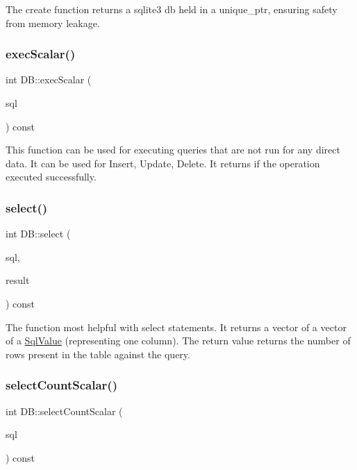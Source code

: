 The create function returns a sqlite3 db held in a unique\+\_\+ptr, ensuring safety from memory leakage. \mbox{\label{classDB_aa81d5bd268236cb48a89717924c957d2}} 
\subsubsection{\texorpdfstring{exec\+Scalar()}{execScalar()}}
{\footnotesize\ttfamily int D\+B\+::exec\+Scalar (\begin{DoxyParamCaption}\item[{const char $\ast$}]{sql }\end{DoxyParamCaption}) const}

This function can be used for executing queries that are not run for any direct data. It can be used for Insert, Update, Delete. It returns if the operation executed successfully. \mbox{\label{classDB_a415cfd60411cfaaba4e88939a54e51eb}} 
\subsubsection{\texorpdfstring{select()}{select()}}
{\footnotesize\ttfamily int D\+B\+::select (\begin{DoxyParamCaption}\item[{const char $\ast$}]{sql,  }\item[{\mbox{\hyperlink{db_8h_a356f4bbcc8528145c25584033ef0bcb8}{sql\+Result}} \&}]{result }\end{DoxyParamCaption}) const}

The function most helpful with select statements. It returns a vector of a vector of a \mbox{\hyperlink{structSqlValue}{Sql\+Value}} (representing one column). The return value returns the number of rows present in the table against the query. \mbox{\label{classDB_a19e12469303264225f563b14c15bc2e6}} 
\subsubsection{\texorpdfstring{select\+Count\+Scalar()}{selectCountScalar()}}
{\footnotesize\ttfamily int D\+B\+::select\+Count\+Scalar (\begin{DoxyParamCaption}\item[{const char $\ast$}]{sql }\end{DoxyParamCaption}) const}

